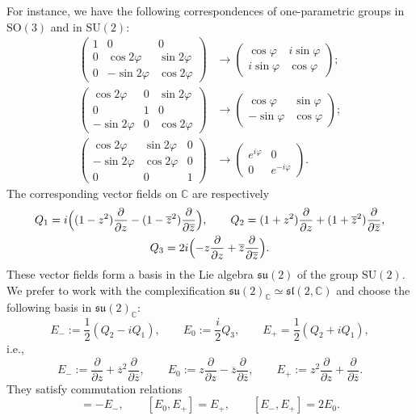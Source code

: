 \documentclass[10pt,a4paper]{amsart}
\def\SU{\mathrm {SU}}
\def\SO{\mathrm  {SO}}
\def\phi{\varphi}
\def\C {{\mathbb C }}
\def\ov{\overline}
\begin{document}
For instance, we  have the following correspondences of 
one-parametric groups in $\SO(3)$ and in $\SU(2)$:
\begin{align*}
\begin{pmatrix}1&0&0\\
0&\cos 2\phi&\sin2\phi\\
0&-\sin 2\phi&\cos 2\phi
\end{pmatrix}&\longrightarrow
\begin{pmatrix}
\cos\phi& i \sin\phi
\\
i \sin\phi&\cos\phi
\end{pmatrix};
\\
\begin{pmatrix}
\cos2\phi&0&\sin 2\phi\\
0&1&0\\
-\sin 2\phi&0&\cos 2\phi
\end{pmatrix}&
\longrightarrow
\begin{pmatrix}
\cos \phi&\sin\phi\\
-\sin\phi&\cos\phi
\end{pmatrix};
\\
\begin{pmatrix}
\cos 2\phi&\sin 2\phi&0\\
-\sin 2\phi&\cos 2\phi&0\\
0&0&1
\end{pmatrix}
&
\longrightarrow
\begin{pmatrix}
e^{i\phi}&0\\
0&e^{-i\phi}
\end{pmatrix}.
\end{align*}
The corresponding vector fields on $\C$ are
respectively
\begin{gather*}
Q_1=i\Bigl((1-z^2)\frac{\partial}{\partial z}-
(1-\ov z^2)\frac{\partial}{\partial \ov z}\Bigr)
,\qquad
Q_2=(1+z^2)\frac{\partial}{\partial z}+
 (1+\ov z^2)\frac{\partial}{\partial \ov z},\\
Q_3= 2i\Bigl(-z \frac{\partial}{\partial z}+
 \ov z \frac{\partial}{\partial\ov z}\Bigr).
\end{gather*}
These vector fields form a basis in the Lie algebra $\mathfrak{su}(2)$
of the group $\SU(2)$. We prefer to work with the complexification
$\mathfrak{su}(2)_\C\simeq \mathfrak{sl}(2,\C)$ and choose the following basis
in $\mathfrak{su}(2)_\C$:
$$
E_-:=\frac12(Q_2-i Q_1),\qquad E_0:=\frac i2 Q_3,\qquad 
E_+=\frac12(Q_2+i Q_1),
$$
i.e.,
\begin{equation}
E_-:=\frac{\partial}{\partial z}+\ov z^2 \frac{\partial}{\partial \ov z},
\qquad 
E_0:=z\frac{\partial}{\partial z}-\ov z\frac{\partial}{\partial \ov z},\qquad
E_+:=z^2\frac{\partial}{\partial z}+\frac{\partial}{\partial \ov z}.
\label{eq:basis-E}
\end{equation}
They satisfy commutation relations
\begin{equation}
[E_0,E_-]=-E_-,\qquad [E_0,E_+]=E_+,\qquad [E_-,E_+]=2E_0.
\end{equation}
\end{document}
